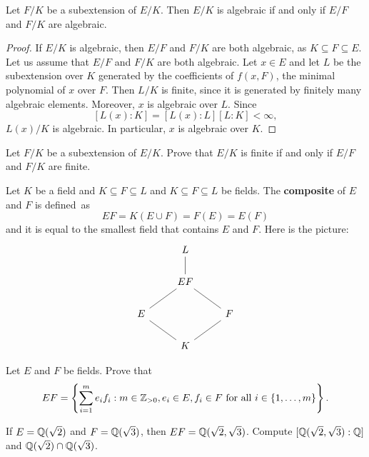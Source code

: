 \begin{proposition}
	Let $F/K$ be a subextension of $E/K$. Then $E/K$ is algebraic 
	if and only if $E/F$ and $F/K$ are algebraic. 
\end{proposition}

\begin{proof}
    If $E/K$ is algebraic, then $E/F$ and $F/K$ are both algebraic, 
    as $K\subseteq F\subseteq E$. 
    Let us assume that $E/F$ and $F/K$ are both algebraic. Let $x\in E$ and 
    let $L$ be the subextension over $K$ generated by the coefficients of $f(x,F)$, 
    the minimal polynomial of $x$ over $F$. Then $L/K$ is finite, since it is generated
    by finitely many algebraic elements. Moreover, $x$ is algebraic over $L$. Since 
    \[
    [L(x):K]=[L(x):L][L:K]<\infty,
    \]
    $L(x)/K$ is algebraic. In particular, $x$ is algebraic over $K$. 
\end{proof}

\begin{exercise}
	Let $F/K$ be a subextension of $E/K$. Prove that $E/K$ is finite 
	if and only if $E/F$ and $F/K$ are finite. 
\end{exercise}

Let $K$ be a field and $K\subseteq 
F\subseteq L$ and $K\subseteq F\subseteq L$ be fields. The \textbf{composite}  
of $E$ and $F$ is defined~as 
\[
EF=K(E\cup F)=F(E)=E(F)
\]
and it is equal to the 
smallest field that contains $E$ and $F$. Here is the
picture:
\[\begin{tikzcd}
	& L \\
	& EF \\
	E && F \\
	& K
	\arrow[no head, from=1-2, to=2-2]
	\arrow[no head, from=2-2, to=3-1]
	\arrow[no head, from=2-2, to=3-3]
	\arrow[no head, from=3-1, to=4-2]
	\arrow[no head, from=4-2, to=3-3]
\end{tikzcd}\]


\begin{exercise}
    Let $E$ and $F$ be fields. 
    Prove that 
    \[
    EF=\left\{\sum_{i=1}^me_if_i:m\in\mathbb{Z}_{>0},e_i\in E,f_i\in F\text{ for all $i\in\{1,\dots,m\}$}\right\}.
    \]
\end{exercise}

\begin{exercise}
    If $E=\mathbb{Q}(\sqrt{2})$ and $F=\mathbb{Q}(\sqrt{3})$, then $EF=\mathbb{Q}(\sqrt{2},\sqrt{3})$. 
    Compute $[\mathbb{Q}(\sqrt{2},\sqrt{3}):\mathbb{Q}]$ and 
    $\mathbb{Q}(\sqrt{2})\cap\mathbb{Q}(\sqrt{3})$. 
\end{exercise}

